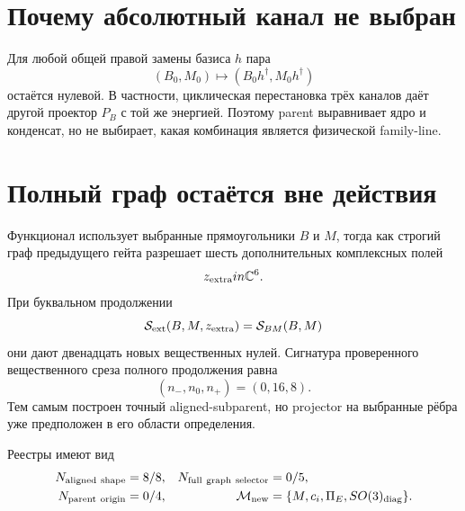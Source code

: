 \section{Почему абсолютный канал не выбран}

Для любой общей правой замены базиса $h$ пара
\begin{equation}
 (B_0,M_0)\longmapsto(B_0h^\dagger,M_0h^\dagger)
 \label{eq:v8-isotypic-mass-selector-vacuum-orbit}
\end{equation}
остаётся нулевой. В частности, циклическая перестановка трёх каналов даёт
другой проектор $P_B$ с той же энергией. Поэтому parent выравнивает ядро и
конденсат, но не выбирает, какая комбинация является физической family-line.

\section{Полный граф остаётся вне действия}

Функционал использует выбранные прямоугольники $B$ и $M$, тогда как строгий
граф предыдущего гейта разрешает шесть дополнительных комплексных полей
\begin{equation}
 z_{\rm extra}in\mathbb C^6.
 \label{eq:v8-isotypic-mass-selector-extra-fields}
\end{equation}
При буквальном продолжении
\begin{equation}
 \mathcal S_{\rm ext}(B,M,z_{\rm extra})=\mathcal S_{BM}(B,M)
 \label{eq:v8-isotypic-mass-selector-flat-extension}
\end{equation}
они дают двенадцать новых вещественных нулей. Сигнатура проверенного
вещественного среза полного продолжения равна
\begin{equation}
 (n_-,n_0,n_+)=(0,16,8).
 \label{eq:v8-isotypic-mass-selector-full-signature}
\end{equation}
Тем самым построен точный aligned-subparent, но projector на выбранные
рёбра уже предположен в его области определения.

Реестры имеют вид
\begin{equation}
 \begin{aligned}
 N_{\rm aligned\ shape}&=8/8,
 &N_{\rm full\ graph\ selector}&=0/5,\\
 N_{\rm parent\ origin}&=0/4,
 &\mathcal M_{\rm new}&=\{M,c_i,\Pi_E,SO(3)_{\rm diag}\}.
 \end{aligned}
 \label{eq:v8-isotypic-mass-selector-ledgers}
\end{equation}

